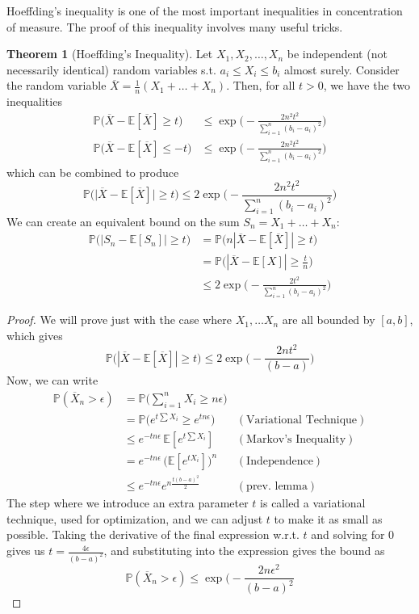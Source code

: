 \documentclass{article}
\theoremstyle{definition}
\newtheorem{theorem}{Theorem}[section]
\theoremstyle{remark}
\theoremstyle{definition}
\begin{document}
Hoeffding's inequality is one of the most important inequalities in concentration of measure. The proof of this inequality involves many useful tricks. 

\begin{theorem}[Hoeffding's Inequality]
Let $X_1, X_2, \ldots, X_n$ be independent (not necessarily identical) random variables s.t. $a_i \leq X_i \leq b_i$ almost surely. Consider the random variable $\overline{X} = \frac{1}{n} (X_1 + \ldots + X_n)$. Then, for all $t > 0$, we have the two inequalities
\begin{align*}
    \mathbb{P}\big( \overline{X} - \mathbb{E}[\overline{X}] \geq t \big) & \leq \exp \bigg( -\frac{2 n^2 t^2}{\sum_{i=1}^n (b_i - a_i)^2} \bigg) \\
    \mathbb{P}\big( \overline{X} - \mathbb{E}[\overline{X}] \leq -t \big) & \leq \exp \bigg( -\frac{2 n^2 t^2}{\sum_{i=1}^n (b_i - a_i)^2} \bigg)
\end{align*}
which can be combined to produce 
\[\mathbb{P}\big( \big| \overline{X} - \mathbb{E}[\overline{X}] \big| \geq t \big) \leq 2 \exp \bigg( -\frac{2 n^2 t^2}{\sum_{i=1}^n (b_i - a_i)^2} \bigg)\]
We can create an equivalent bound on the sum $S_n = X_1 + \ldots + X_n$: 
\begin{align*}
    \mathbb{P}\big(| S_n - \mathbb{E}[S_n] | \geq t\big) & = \mathbb{P}\big( n |\overline{X} - \mathbb{E}[\overline{X}] | \geq t \big) \\
    & = \mathbb{P} \big( |\overline{X} - \mathbb{E}[X] | \geq \frac{t}{n} \big) \\
    & \leq 2 \exp \bigg( -\frac{2 t^2}{\sum_{i=1}^n (b_i - a_i)^2} \bigg) 
\end{align*}
\end{theorem}
\begin{proof}
We will prove just with the case where $X_1, \ldots X_n$ are all bounded by $[a, b]$, which gives 
\[\mathbb{P} \big( |\overline{X} - \mathbb{E}[\overline{X}] | \geq t \big) \leq 2 \exp \bigg( - \frac{2 n t^2}{(b - a)}\bigg)\] 
Now, we can write 
\begin{align*}
    \mathbb{P}(\overline{X}_n > \epsilon ) & = \mathbb{P} \Big( \sum_{i=1}^n X_i \geq n \epsilon \Big) \\
    & = \mathbb{P} \big( e^{t \sum X_i} \geq e^{t n \epsilon} \big) & (\text{Variational Technique}) \\
    & \leq e^{- t n \epsilon} \, \mathbb{E}[e^{t \sum X_i}] & (\text{Markov's Inequality}) \\
    & = e^{-t n \epsilon} \, \big( \mathbb{E}[ e^{t X_i}] \big)^n & (\text{Independence}) \\
    & \leq e^{-t n \epsilon} e^{n \frac{t (b - a)^2}{2}} & (\text{prev. lemma}) 
\end{align*}
The step where we introduce an extra parameter $t$ is called a variational technique, used for optimization, and we can adjust $t$ to make it as small as possible. Taking the derivative of the final expression w.r.t. $t$ and solving for $0$ gives us $t = \frac{4 \epsilon}{(b - a)^2}$, and substituting into the expression gives the bound as 
\[\mathbb{P}(\overline{X}_n > \epsilon ) \leq \exp \bigg(- \frac{2 n \epsilon^2}{(b - a)^2}\]
\end{proof}
\end{document}
